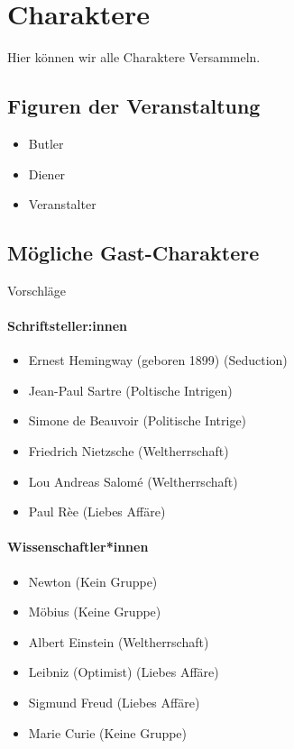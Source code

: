 \documentclass[12pt, a4paper, openany]{report}
\begin{document}
\chapter{Charaktere}
Hier können wir alle Charaktere Versammeln.

\section{Figuren der Veranstaltung}
\begin{itemize}
   	 \item Butler
    	\item Diener
    	\item Veranstalter
\end{itemize}

\section{Mögliche Gast-Charaktere}
Vorschläge 
\subsubsection{Schriftsteller:innen}
\begin{itemize}
    	\item Ernest Hemingway (geboren 1899) (Seduction)
    	\item Jean-Paul Sartre (Poltische Intrigen)
    	\item Simone de Beauvoir (Politische Intrige)
    	\item Friedrich Nietzsche (Weltherrschaft)
    	\item Lou Andreas Salomé (Weltherrschaft)
    	\item Paul Rèe (Liebes Affäre)
\end{itemize}

\subsubsection{Wissenschaftler*innen}
\begin{itemize}
    	\item Newton (Kein Gruppe) 
    	\item Möbius (Keine Gruppe)
    	\item Albert Einstein (Weltherrschaft)
	\item Leibniz (Optimist) (Liebes Affäre)
	\item Sigmund Freud (Liebes Affäre)
	\item Marie Curie (Keine Gruppe)
\end{itemize}
\end{document}
